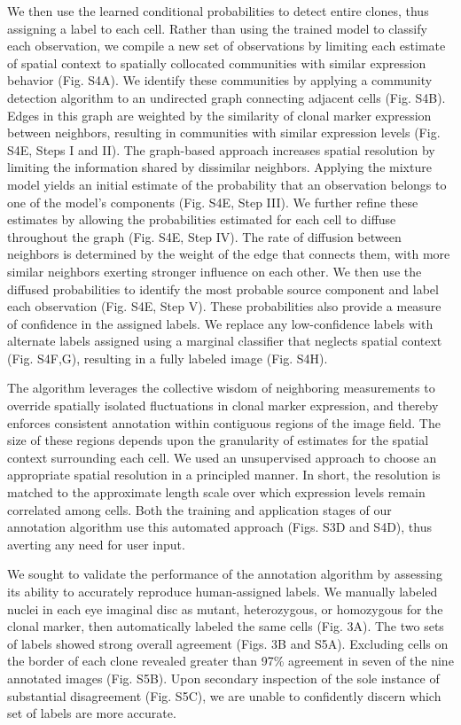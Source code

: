 We then use the learned conditional probabilities to detect entire clones, thus assigning a label to each cell. Rather than using the trained model to classify each observation, we compile a new set of observations by limiting each estimate of spatial context to spatially collocated communities with similar expression behavior (Fig. S4A). We identify these communities by applying a community detection algorithm to an undirected graph connecting adjacent cells (Fig. S4B). Edges in this graph are weighted by the similarity of clonal marker expression between neighbors, resulting in communities with similar expression levels (Fig. S4E, Steps I and II). The graph-based approach increases spatial resolution by limiting the information shared by dissimilar neighbors. Applying the mixture model yields an initial estimate of the probability that an observation belongs to one of the model's components (Fig. S4E, Step III). We further refine these estimates by allowing the probabilities estimated for each cell to diffuse throughout the graph (Fig. S4E, Step IV). The rate of diffusion between neighbors is determined by the weight of the edge that connects them, with more similar neighbors exerting stronger influence on each other. We then use the diffused probabilities to identify the most probable source component and label each observation (Fig. S4E, Step V). These probabilities also provide a measure of confidence in the assigned labels. We replace any low-confidence labels with alternate labels assigned using a marginal classifier that neglects spatial context (Fig. S4F,G), resulting in a fully labeled image (Fig. S4H).

The algorithm leverages the collective wisdom of neighboring measurements to override spatially isolated fluctuations in clonal marker expression, and thereby enforces consistent annotation within contiguous regions of the image field. The size of these regions depends upon the granularity of estimates for the spatial context surrounding each cell. We used an unsupervised approach to choose an appropriate spatial resolution in a principled manner. In short, the resolution is matched to the approximate length scale over which expression levels remain correlated among cells. Both the training and application stages of our annotation algorithm use this automated approach (Figs. S3D and S4D), thus averting any need for user input.

We sought to validate the performance of the annotation algorithm by assessing its ability to accurately reproduce human-assigned labels. We manually labeled nuclei in each eye imaginal disc as mutant, heterozygous, or homozygous for the clonal marker, then automatically labeled the same cells (Fig. 3A). The two sets of labels showed strong overall agreement (Figs. 3B and S5A). Excluding cells on the border of each clone revealed greater than 97\% agreement in seven of the nine annotated images (Fig. S5B). Upon secondary inspection of the sole instance of substantial disagreement (Fig. S5C), we are unable to confidently discern which set of labels are more accurate.

